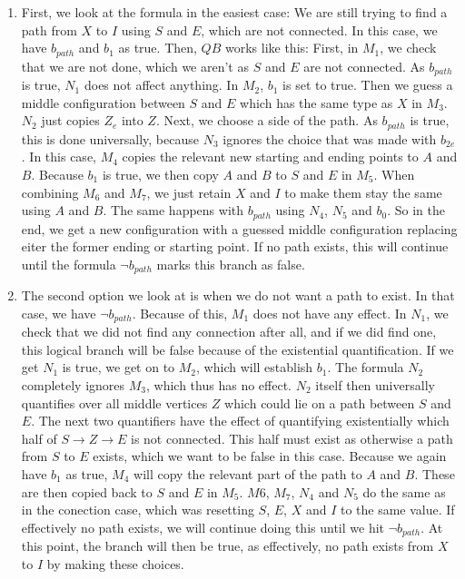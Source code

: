 \begin{enumerate}
    \item First, we look at the formula in the easiest case: We are still trying to find a path from $X$ to $I$ using $S$ and $E$, which are not connected.
    In this case, we have $b_{path}$ and $b_1$ as true.
    Then, $QB$ works like this:
    First, in $M_1$, we check that we are not done, which we aren't as $S$ and $E$ are not connected.
    As $b_{path}$ is true, $N_1$ does not affect anything.
    In $M_2$, $b_1$ is set to true.
    Then we guess a middle configuration between $S$ and $E$ which has the same type as $X$ in $M_3$.
    $N_2$ just copies $Z_e$ into $Z$.
    Next, we choose a side of the path.
    As $b_{path}$ is true, this is done universally, because $N_3$ ignores the choice that was made with $b_{2e}$.
    In this case, $M_4$ copies the relevant new starting and ending points to $A$ and $B$.
    Because $b_1$ is true, we then copy $A$ and $B$ to $S$ and $E$ in $M_5$.
    When combining $M_6$ and $M_7$, we just retain $X$ and $I$ to make them stay the same using $A$ and $B$.
    The same happens with $b_{path}$ using $N_4$, $N_5$ and $b_0$.
    So in the end, we get a new configuration with a guessed middle configuration replacing eiter the former ending or starting point.
    If no path exists, this will continue until the formula $\neg b_{path}$ marks this branch as false.

    \item The second option we look at is when we do not want a path to exist.
    In that case, we have $\neg b_{path}$.
    Because of this, $M_1$ does not have any effect.
    In $N_1$, we check that we did not find any connection after all, and if we did find one, this logical branch will be false because of the existential quantification.
    If we get $N_1$ is true, we get on to $M_2$, which will establish $b_1$.
    The formula $N_2$ completely ignores $M_3$, which thus has no effect.
    $N_2$ itself then universally quantifies over all middle vertices $Z$ which could lie on a path between $S$ and $E$.
    The next two quantifiers have the effect of quantifying existentially which half of $S \to Z \to E$ is not connected.
    This half must exist as otherwise a path from $S$ to $E$ exists, which we want to be false in this case.
    Because we again have $b_1$ as true, $M_4$ will copy the relevant part of the path to $A$ and $B$.
    These are then copied back to $S$ and $E$ in $M_5$.
    $M6$, $M_7$, $N_4$ and $N_5$ do the same as in the conection case, which was resetting $S$, $E$, $X$ and $I$ to the same value.
    If effectively no path exists, we will continue doing this until we hit $\neg b_{path}$.
    At this point, the branch will then be true, as effectively, no path exists from $X$ to $I$ by making these choices.


\end{enumerate}
